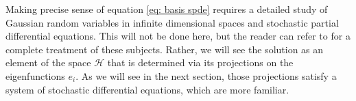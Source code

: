 Making precise sense of equation \eqref{eq: basis spde} requires a detailed study
of Gaussian random variables in infinite dimensional spaces and stochastic
partial differential equations. This will not be done here, but the reader can
refer to \citep{da2008stochastic,hairerphd,hairer2009introduction} for a
complete treatment of these subjects. Rather, we will see the solution as an
element of the space $\mathcal H$ that is determined via its projections on the
eigenfunctions $e_i$. As we will see in the next section, those projections
satisfy a system of stochastic differential equations, which are more familiar.
